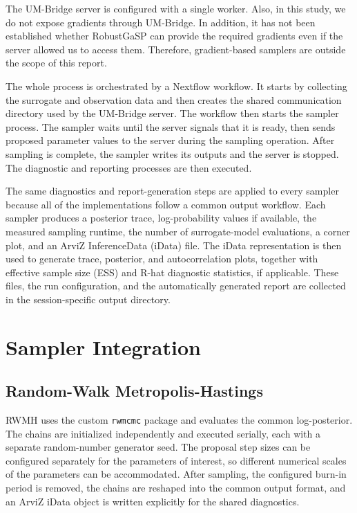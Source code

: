 The UM-Bridge server is configured with a single worker. Also, in this study, we do not expose gradients through UM-Bridge. In addition, it has not been established whether RobustGaSP can provide the required gradients even if the server allowed us to access them. Therefore, gradient-based samplers are outside the scope of this report.

The whole process is orchestrated by a Nextflow workflow. It starts by collecting the surrogate and observation data and then creates the shared communication directory used by the UM-Bridge server. The workflow then starts the sampler process. The sampler waits until the server signals that it is ready, then sends proposed parameter values to the server during the sampling operation. After sampling is complete, the sampler writes its outputs and the server is stopped. The diagnostic and reporting processes are then executed.

The same diagnostics and report-generation steps are applied to every sampler because all of the implementations follow a common output workflow. Each sampler produces a posterior trace, log-probability values if available, the measured sampling runtime, the number of surrogate-model evaluations, a corner plot, and an ArviZ InferenceData (iData) file. The iData representation is then used to generate trace, posterior, and autocorrelation plots, together with effective sample size (ESS) and R-hat diagnostic statistics, if applicable. These files, the run configuration, and the automatically generated report are collected in the session-specific output directory.


\section{Sampler Integration}
\label{sec:sampler-integration}

\subsection{Random-Walk Metropolis-Hastings}
\label{sec:integration-rwmh}

RWMH uses the custom \texttt{rwmcmc} package and evaluates the common log-posterior. The chains are initialized independently and executed serially, each with a separate random-number generator seed. The proposal step sizes can be configured separately for the parameters of interest, so different numerical scales of the parameters can be accommodated. After sampling, the configured burn-in period is removed, the chains are reshaped into the common output format, and an ArviZ iData object is written explicitly for the shared diagnostics.

